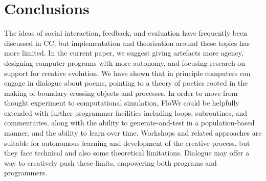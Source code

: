 \section{Conclusions}
\label{sec:conc}

The ideas of social interaction, feedback, and evaluation have frequently been discussed in CC, but implementation
and theorisation around these topics has more limited.
In the current paper, we suggest giving artefacts more agency, designing computer programs with more autonomy, and focusing research on support for creative evolution.
We have shown that in principle computers can engage in dialogue about poems, pointing to a theory of poetics rooted in the making of boundary-crossing objects and processes.
In order to move from thought experiment to computational simulation, FloWr could be helpfully extended with further programmer facilities including loops, subroutines, and commentaries, along with the ability to generate-and-test in a population-based manner, and the ability to learn over time.
Workshops and related approaches are suitable for autonomous learning and development of the creative process, but they face technical and also some theoretical limitations.   
Dialogue may offer a way to creatively push these limits, empowering both programs and programmers.


